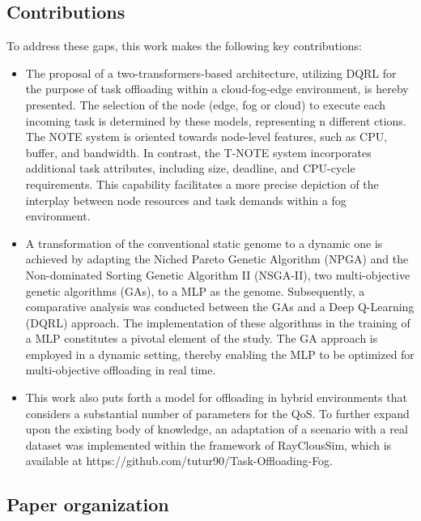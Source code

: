 \documentclass[preprint,12pt]{elsarticle}
\begin{document}
\subsection{Contributions}



To address these gaps, this work makes the following key contributions:



\begin{itemize} 


    \item The proposal of a two-transformers-based architecture, utilizing DQRL for the purpose of task offloading within a cloud-fog-edge environment, is hereby presented. The selection of the node (edge, fog or cloud) to execute each incoming task is determined by these models, representing n different ctions. The NOTE system is oriented towards node-level features, such as CPU, buffer, and bandwidth. In contrast, the T-NOTE system incorporates additional task attributes, including size, deadline, and CPU-cycle requirements. This capability facilitates a more precise depiction of the interplay between node resources and task demands within a fog environment.

    \item A transformation of the conventional static genome to a dynamic one is achieved by adapting the Niched Pareto Genetic Algorithm (NPGA) and the Non-dominated Sorting Genetic Algorithm II (NSGA-II), two multi-objective genetic algorithms (GAs), to a MLP as the genome. Subsequently, a comparative analysis was conducted between the GAs and a Deep Q-Learning (DQRL) approach. The implementation of these algorithms in the training of a MLP constitutes a pivotal element of the study. The GA approach is employed in a dynamic setting, thereby enabling the MLP to be optimized for multi-objective offloading in real time.

    
    \item This work also puts forth a model for offloading in hybrid environments that considers a substantial number of parameters for the QoS. To further expand upon the existing body of knowledge, an adaptation of a scenario with a real dataset was implemented within the framework of RayClousSim, which is available at https://github.com/tutur90/Task-Offloading-Fog.


\end{itemize}

\subsection{Paper organization}
\end{document}
